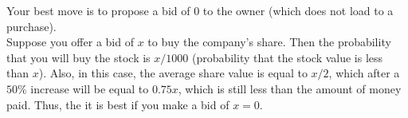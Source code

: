 \begin{solution}
Your best move is to propose a bid of $0$ to the owner (which does not load to a purchase).\\[0.2cm]
	
Suppose you offer a bid of $x$ to buy the company's share. Then the probability that you will buy the stock is $x/1000$ (probability that the stock value is  less than $x$). Also, in this case, the average share value is equal to $x/2$, which after a $50\%$ increase will be equal to $0.75x$, which is still less than the amount of money paid. Thus, the it is best if you make a bid of $x=0$.
\end{solution}
